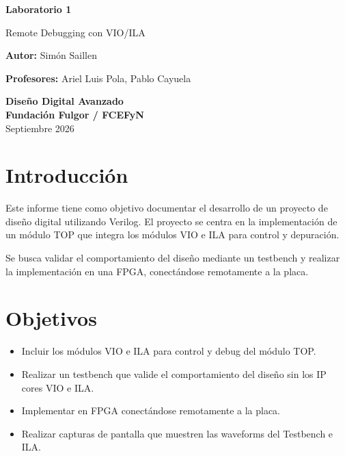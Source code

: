 \documentclass[11pt,a4paper]{article}
\begin{document}
\begin{titlepage}
    \begin{center}
        \vspace*{1cm}

        \Huge
        \textbf{Laboratorio 1}

        \vspace{0.5cm}
        \LARGE
        Remote Debugging con VIO/ILA

        \vspace{1.5cm}

        \vfill

        \Large
        \textbf{Autor:} Simón Saillen

        \Large
        \textbf{Profesores:} Ariel Luis Pola, Pablo Cayuela

        \vspace{0.5cm}

        \Large
        \textbf{Diseño Digital Avanzado}\\
        \vspace{0.2cm}
        \textbf{Fundación Fulgor / FCEFyN}\\
        \vspace{0.2cm}
        Septiembre 2026

    \end{center}
\end{titlepage}
\newpage

\section{Introducción}

Este informe tiene como objetivo documentar el desarrollo de un proyecto de
diseño digital utilizando Verilog. El proyecto se centra en la implementación
de un módulo TOP que integra los módulos VIO e ILA para control y depuración.

Se busca validar el comportamiento del diseño mediante un testbench y realizar
la implementación en una FPGA, conectándose remotamente a la placa.

\section{Objetivos}

\begin{itemize}
    \item Incluir los módulos VIO e ILA para control y debug del módulo TOP.\@
    \item Realizar un testbench que valide el comportamiento del diseño sin los IP cores
          VIO e ILA.\@
    \item Implementar en FPGA conectándose remotamente a la placa.
    \item Realizar capturas de pantalla que muestren las waveforms del Testbench e ILA.\@
\end{itemize}
\end{document}
